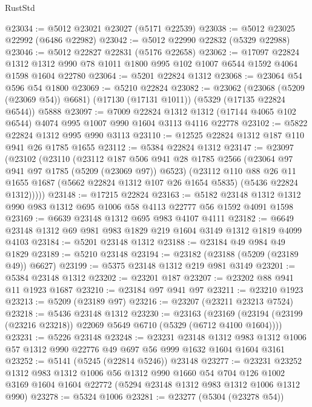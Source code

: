 \begin{lexlean}{RustStd}
\begin{coremodule}
@23034 := @5012 @23021 @23027 (@5171 @22539)
@23038 := @5012 @23025 @22992 (@6486 @22982)
@23042 := @5012 @22990 @22832 (@5329 @22988)
@23046 := @5012 @22827 @22831 (@5176 @22658)
@23062 := @17097
    @22824
    @1312
    @1312
    @990
    @78
    @1011
    @1800
    @995
    @102
    @1007
    @6544
    @1592
    @4064
    @1598
    @1604
    @22780
@23064 := @5201 @22824 @1312
@23068 := @23064 @54 @596 @54 @1800
@23069 := @5210 @22824
@23082 := @23062
    (@23068 (@5209 (@23069 @54)) @6681)
    (@17130 (@17131 @1011))
    (@5329 (@17135 @22824 @6544))
    @5888
@23097 := @7009
    @22824
    @1312
    @1312
    (@17144 @4065 @102 @6544)
    @4074
    @995
    @1007
    @990
    @1604
    @3113
    @4116
    @22778
@23102 := @5822 @22824 @1312 @995 @990 @3113
@23110 := @12525 @22824 @1312 @187 @110 @941 @26 @1785 @1655
@23112 := @5384 @22824 @1312
@23147 := @23097
    (@23102
      (@23110
        (@23112
          @187
          @506
          @941
          @28
          @1785
          @2566
          (@23064 @97 @941 @97 @1785 (@5209 (@23069 @97)) @6523)
          (@23112
            @110
            @88
            @26
            @11
            @1655
            @1687
            (@5662 @22824 @1312 @107 @26 @1654 @5835)
            (@5436 @22824 @1312)))))
@23148 := @17215 @22824
@23163 := @5182 @23148 @1312 @1312 @990 @983 @1312 @695 @1006 @58 @4113 @22777 @56 @1592 @4091 @1598
@23169 := @6639 @23148 @1312 @695 @983 @4107 @4111
@23182 := @6649 @23148 @1312 @69 @981 @983 @1829 @219 @1604 @3149 @1312 @1819 @4099 @4103
@23184 := @5201 @23148 @1312
@23188 := @23184 @49 @984 @49 @1829
@23189 := @5210 @23148
@23194 := @23182 (@23188 (@5209 (@23189 @49)) @6627)
@23199 := @5375 @23148 @1312 @219 @981 @3149
@23201 := @5384 @23148 @1312
@23202 := @23201 @187
@23207 := @23202 @88 @941 @11 @1923 @1687
@23210 := @23184 @97 @941 @97
@23211 := @23210 @1923
@23213 := @5209 (@23189 @97)
@23216 := @23207 (@23211 @23213 @7524)
@23218 := @5436 @23148 @1312
@23230 := @23163
    (@23169 (@23194 (@23199 (@23216 @23218)) @22069 @5649 @6710 (@5329 (@6712 @4100 @1604))))
@23231 := @5226 @23148
@23248 := @23231
    @23148
    @1312
    @983
    @1312
    @1006
    @57
    @1312
    @990
    @22776
    @49
    @697
    @56
    @999
    @1632
    @1604
    @1604
    @3161
@23252 := @5141 (@5245 (@22814 @5246)) @23148
@23277 := @23231
    @23252
    @1312
    @983
    @1312
    @1006
    @56
    @1312
    @990
    @1660
    @54
    @704
    @126
    @1002
    @3169
    @1604
    @1604
    @22772
    (@5294 @23148 @1312 @983 @1312 @1006 @1312 @990)
@23278 := @5324 @1006
@23281 := @23277 (@5304 (@23278 @54))

\end{coremodule}
\end{lexlean}
